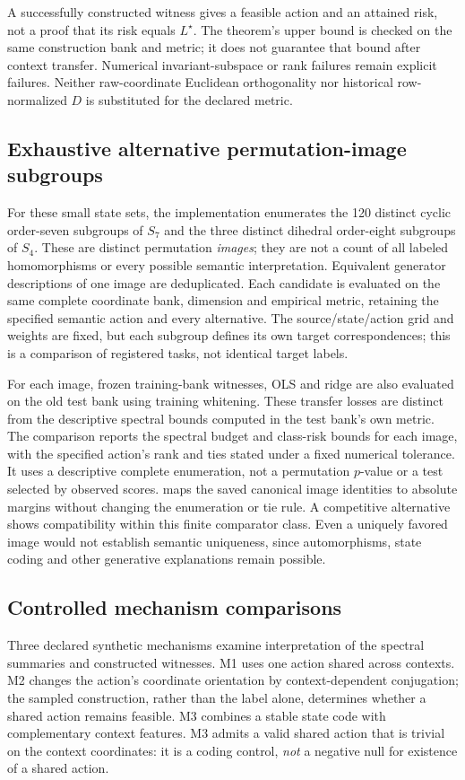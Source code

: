A successfully constructed witness gives a feasible action and an attained risk, not a proof that its risk equals $L^\star$. The theorem's upper bound is checked on the same construction bank and metric; it does not guarantee that bound after context transfer. Numerical invariant-subspace or rank failures remain explicit failures. Neither raw-coordinate Euclidean orthogonality nor historical row-normalized $D$ is substituted for the declared metric.

\subsection{Exhaustive alternative permutation-image subgroups}
For these small state sets, the implementation enumerates the 120 distinct cyclic order-seven subgroups of $S_7$ and the three distinct dihedral order-eight subgroups of $S_4$. These are distinct permutation \emph{images}; they are not a count of all labeled homomorphisms or every possible semantic interpretation. Equivalent generator descriptions of one image are deduplicated. Each candidate is evaluated on the same complete coordinate bank, dimension and empirical metric, retaining the specified semantic action and every alternative. The source/state/action grid and weights are fixed, but each subgroup defines its own target correspondences; this is a comparison of registered tasks, not identical target labels.

For each image, frozen training-bank witnesses, OLS and ridge are also evaluated on the old test bank using training whitening. These transfer losses are distinct from the descriptive spectral bounds computed in the test bank's own metric. The comparison reports the spectral budget and class-risk bounds for each image, with the specified action's rank and ties stated under a fixed numerical tolerance. It uses a descriptive complete enumeration, not a permutation $p$-value or a test selected by observed scores.  maps the saved canonical image identities to absolute margins without changing the enumeration or tie rule. A competitive alternative shows compatibility within this finite comparator class. Even a uniquely favored image would not establish semantic uniqueness, since automorphisms, state coding and other generative explanations remain possible.

\subsection{Controlled mechanism comparisons}
Three declared synthetic mechanisms examine interpretation of the spectral summaries and constructed witnesses. M1 uses one action shared across contexts. M2 changes the action's coordinate orientation by context-dependent conjugation; the sampled construction, rather than the label alone, determines whether a shared action remains feasible. M3 combines a stable state code with complementary context features. M3 admits a valid shared action that is trivial on the context coordinates: it is a coding control, \emph{not} a negative null for existence of a shared action.

